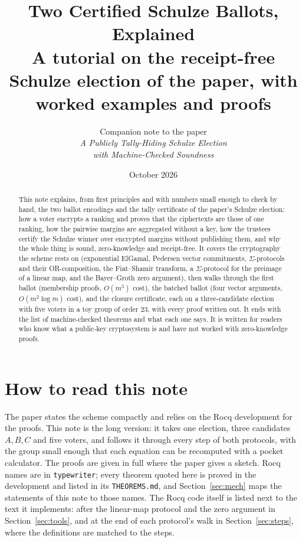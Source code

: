\documentclass[11pt,a4paper]{article}
\title{Two Certified Schulze Ballots, Explained\\[4pt]
\large A tutorial on the receipt-free Schulze election of the paper, with worked examples and proofs}
\author{Companion note to the paper\\ \emph{A Publicly Tally-Hiding Schulze Election}\\ \emph{with Machine-Checked Soundness}}
\date{October 2026}
\newcommand{\rocq}[1]{\texttt{#1}}
\theoremstyle{remark}
\begin{document}
\maketitle

\begin{abstract}
This note explains, from first principles and with numbers small enough to
check by hand, the two ballot encodings and the tally certificate of the
paper's Schulze election: how a voter encrypts a ranking and proves that the
ciphertexts are those of one ranking, how the pairwise margins are
aggregated without a key, how the trustees certify the Schulze winner over
encrypted margins without publishing them, and why the whole thing is sound,
zero-knowledge and receipt-free. It covers the cryptography the scheme rests
on (exponential ElGamal, Pedersen vector commitments, $\Sigma$-protocols and
their OR-composition, the Fiat--Shamir transform, a $\Sigma$-protocol for the
preimage of a linear map, and the Bayer--Groth zero argument), then walks
through the first ballot (membership proofs, $O(m^3)$ cost), the batched
ballot (four vector arguments, $O(m^2 \log m)$ cost), and the closure
certificate, each on a three-candidate election with five voters in a toy
group of order $23$, with every proof written out. It ends with the list of
machine-checked theorems and what each one says. It is written for readers
who know what a public-key cryptosystem is and have not worked with
zero-knowledge proofs.
\end{abstract}

\tableofcontents

\section{How to read this note}\label{sec:howto}
The paper states the scheme compactly and relies on the Rocq development for
the proofs. This note is the long version: it takes one election, three
candidates $A, B, C$ and five voters, and follows it through every step of
both protocols, with the group small enough that each equation can be
recomputed with a pocket calculator. The proofs are given in full where the
paper gives a sketch. Rocq names are in \rocq{typewriter}; every theorem
quoted here is proved in the development and listed in its
\rocq{THEOREMS.md}, and Section~\ref{sec:mech} maps the statements of this
note to those names. The Rocq code itself is listed next to the text it
implements: after the linear-map protocol and the zero argument in
Section~\ref{sec:tools}, and at the end of each protocol's walk in
Section~\ref{sec:steps}, where the definitions are matched to the steps.
\end{document}
